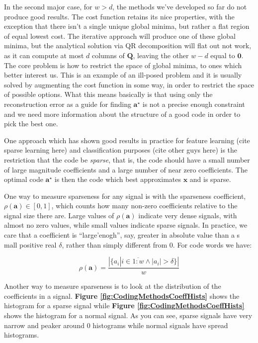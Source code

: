 \documentclass[12pt,a4paper,oneside,english]{UPBThesis}
\newcommand{\hcrange}[2]{\overline{{#1}\colon\!\!{#2}}}
\begin{document}
In the second major case, for $w > d$, the methods we've developed so far do not produce good results. The cost function retains its nice properties, with the exception that there isn't a single unique global minima, but rather a flat region of equal lowest cost. The iterative approach will produce one of these global minima, but the analytical solution via QR decomposition will flat out not work, as it can compute at most $d$ columns of $\textbf{Q}$, leaving the other $w - d$ equal to $\textbf{0}$. The core problem is how to restrict the space of global minima, to ones which better interest us. This is an example of an ill-posed problem and it is usually solved by augmenting the cost function in some way, in order to restrict the space of possible options. What this means basically is that using only the reconstruction error as a guide for finding $\textbf{a}^\star$ is not a precise enough constraint and we need more information about the structure of a good code in order to pick the best one.

One approach which has shown good results in practice for feature learning (cite sparse learning here) and classification purposes (cite other guys here) is the restriction that the code be \emph{sparse}, that is, the code should have a small number of large magnitude coefficients and a large number of near zero coefficients. The optimal code $\textbf{a}^\star$ is then the code which best approximates $\textbf{x}$ and is sparse.

One way to measure sparseness for any signal is with the sparseness coefficient, $\rho(\textbf{a}) \in [0,1]$, which counts how many non-zero coefficients relative to the signal size there are. Large values of $\rho(\textbf{a})$ indicate very dense signals, with almost no zero values, while small values indicate sparse signals. In practice, we care that a coefficient is ``large'enogh'', say, greater in absolute value than a s mall positive real $\delta$, rather than simply different from $0$. For code words we have:

\begin{equation*}
\rho(\textbf{a}) = \frac{\left| \{ a_i \left|\right. i \in \hcrange{1}{w} \wedge \left|a_i\right| > \delta \} \right|}{w}
\end{equation*}

Another way to measure sparseness is to look at the distribution of the coefficients in a signal. \textbf{Figure \ref{fig:CodingMethodsCoeffHists}} shows the histogram for a sparse signal while \textbf{Figure \ref{fig:CodingMethodsCoeffHists}} shows the histogram for a normal signal. As you can see, sparse signals have very narrow and peaker around $0$ histograms while normal signals have spread histograms.
\end{document}
